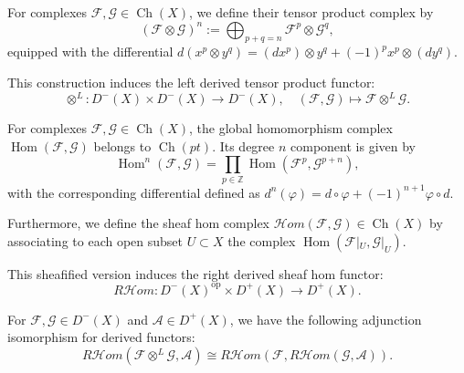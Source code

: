 \begin{definition}
For complexes $\mathcal{F}, \mathcal{G} \in \operatorname{Ch}(X)$, we define their tensor product complex by
\begin{equation*}
    (\mathcal{F} \otimes \mathcal{G})^n := \bigoplus_{p+q=n} \mathcal{F}^p \otimes \mathcal{G}^q,
\end{equation*}
equipped with the differential $d(x^p \otimes y^q) = (dx^p) \otimes y^q + (-1)^p x^p \otimes (dy^q)$.
\end{definition}

This construction induces the left derived tensor product functor:
\begin{equation*}
    \otimes^L : D^-(X) \times D^-(X) \to D^-(X), \quad (\mathcal{F}, \mathcal{G}) \mapsto \mathcal{F} \otimes^L \mathcal{G}.
\end{equation*}

\begin{definition}
For complexes $\mathcal{F}, \mathcal{G} \in \operatorname{Ch}(X)$, the global homomorphism complex $\operatorname{Hom}(\mathcal{F}, \mathcal{G})$ belongs to $\operatorname{Ch}(pt)$. Its degree $n$ component is given by
\begin{equation*}
    \operatorname{Hom}^n(\mathcal{F}, \mathcal{G}) = \prod_{p \in \mathbb{Z}} \operatorname{Hom}(\mathcal{F}^p, \mathcal{G}^{p+n}),
\end{equation*}
with the corresponding differential defined as $d^n(\varphi) = d \circ \varphi + (-1)^{n+1} \varphi \circ d$.

Furthermore, we define the sheaf hom complex $\mathcal{H}om(\mathcal{F}, \mathcal{G}) \in \operatorname{Ch}(X)$ by associating to each open subset $U \subset X$ the complex $\operatorname{Hom}(\mathcal{F}|_U, \mathcal{G}|_U)$.
\end{definition}

This sheafified version induces the right derived sheaf hom functor:
\begin{equation*}
    R\mathcal{H}om : D^-(X)^{\text{op}} \times D^+(X) \to D^+(X).
\end{equation*}

\begin{proposition}[Adjunction]
For $\mathcal{F}, \mathcal{G}\in D^-(X)$ and $\mathcal{A}\in D^+(X)$, we have the following adjunction isomorphism for derived functors:
\begin{equation*}
    R\mathcal{H}om(\mathcal{F} \otimes^L \mathcal{G}, \mathcal{A}) \cong R\mathcal{H}om(\mathcal{F}, R\mathcal{H}om(\mathcal{G}, \mathcal{A})).
\end{equation*}
\end{proposition}

